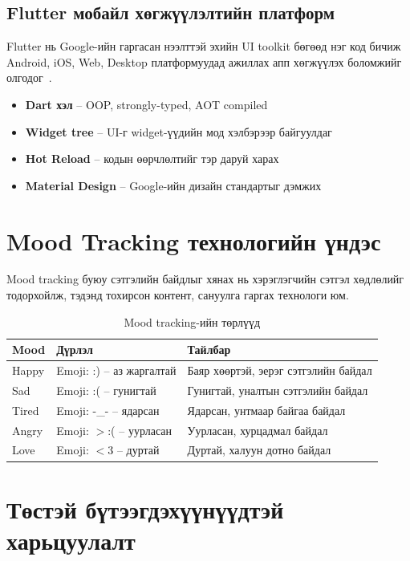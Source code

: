 \subsection{Flutter мобайл хөгжүүлэлтийн платформ}

Flutter нь Google-ийн гаргасан нээлттэй эхийн UI toolkit бөгөөд нэг код бичиж
Android, iOS, Web, Desktop платформуудад ажиллах апп хөгжүүлэх боломжийг олгодог~\cite{windmill2019}.

\begin{itemize}
  \item \textbf{Dart хэл} -- OOP, strongly-typed, AOT compiled
  \item \textbf{Widget tree} -- UI-г widget-үүдийн мод хэлбэрээр байгуулдаг
  \item \textbf{Hot Reload} -- кодын өөрчлөлтийг тэр даруй харах
  \item \textbf{Material Design} -- Google-ийн дизайн стандартыг дэмжих
\end{itemize}

\section{Mood Tracking технологийн үндэс}

Mood tracking буюу сэтгэлийн байдлыг хянах нь хэрэглэгчийн сэтгэл хөдлөлийг
тодорхойлж, тэдэнд тохирсон контент, сануулга гаргах технологи юм.

\begin{longtable}{|p{3cm}|p{5cm}|p{5cm}|}
\caption{Mood tracking-ийн төрлүүд}\\
\hline
\textbf{Mood} & \textbf{Дүрлэл} & \textbf{Тайлбар} \\
\hline
Happy & Emoji: :) -- аз жаргалтай & Баяр хөөртэй, эерэг сэтгэлийн байдал \\
\hline
Sad & Emoji: :( -- гунигтай & Гунигтай, уналтын сэтгэлийн байдал \\
\hline
Tired & Emoji: -\_- -- ядарсан & Ядарсан, унтмаар байгаа байдал \\
\hline
Angry & Emoji: $>$:( -- уурласан & Уурласан, хурцадмал байдал \\
\hline
Love & Emoji: $<$3 -- дуртай & Дуртай, халуун дотно байдал \\
\hline
\end{longtable}

\section{Төстэй бүтээгдэхүүнүүдтэй харьцуулалт}

